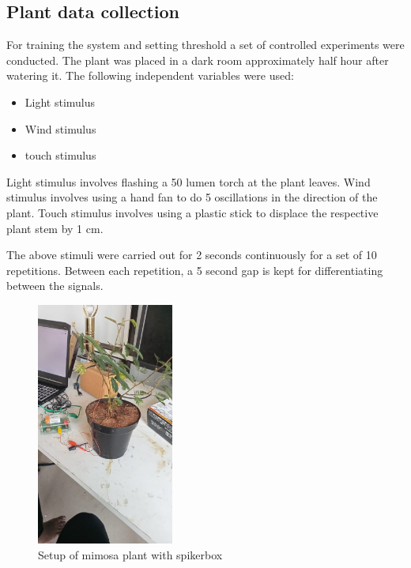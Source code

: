 \documentclass[conference]{IEEEtran}
\begin{document}
    \subsection{Plant data collection}
    \vspace{-\baselineskip}
    For training the system and setting threshold a set of controlled
    experiments were conducted. The plant was placed in a dark room 
    approximately half hour after watering it. The following independent
    variables were used:
    \vspace{-\baselineskip}
    \begin{itemize}
        \item Light stimulus
        \item Wind stimulus
        \item touch stimulus
    \end{itemize}
    Light stimulus involves flashing a 50 lumen torch at the plant leaves.
    Wind stimulus involves using a hand fan to do 5 oscillations in the 
    direction of the plant. Touch stimulus involves using a plastic stick 
    to displace the respective plant stem by 1 cm.
    
    The above stimuli were carried out for 2 seconds continuously for a 
    set of 10 repetitions. Between each repetition, a 5 second gap is
    kept for differentiating between the signals.
    \begin{figure}[H]
        \begin{center}
        \includegraphics[trim={0 15cm 0 4cm},clip,width=0.4\textwidth]{spikesetup}
        \end{center}
        \caption{Setup of mimosa plant with spikerbox}\label{spikesetup}
    \end{figure}
\end{document}
